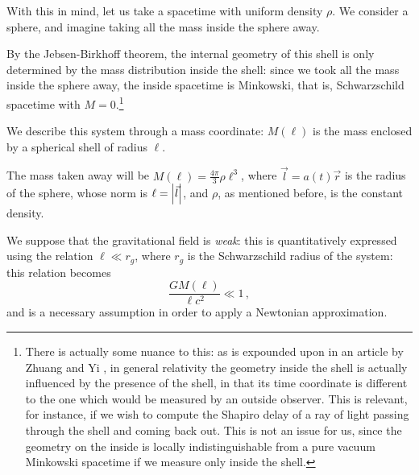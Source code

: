 \documentclass[main.tex]{subfiles}
\begin{document}
With this in mind, let us take a spacetime with uniform density \(\rho\).
We consider a sphere, and imagine taking all the mass inside the sphere away.


By the Jebsen-Birkhoff theorem, the internal geometry of this shell is only determined by the mass distribution inside the shell: since we took all the mass inside the sphere away, the inside spacetime is Minkowski, that is, Schwarzschild spacetime with \(M=0\).\footnote{There is actually some nuance to this: as is expounded upon in an article by Zhuang and Yi \cite{zhangCOMMONMISUNDERSTANDINGBIRKHOFF2012}, in general relativity the geometry inside the shell is actually influenced by the presence of the shell, in that its time coordinate is different to the one which would be measured by an outside observer. This is relevant, for instance, if we wish to compute the Shapiro delay of a ray of light passing through the shell and coming back out.
This is not an issue for us, since the geometry on the inside is locally indistinguishable from a pure vacuum Minkowski spacetime if we measure only inside the shell.}


We describe this system through a mass coordinate: \(M(\ell)\) is the mass enclosed by a spherical shell of radius \(\ell\).

The mass taken away will be \(M(\ell) = \frac{4 \pi}{3} \rho \ell^{3}\), where \(\vec{l} = a(t) \vec{r}\) is the radius of the sphere, whose norm is \(\ell = \abs{\vec{l}}\), and \(\rho \), as mentioned before, is the constant density.

We suppose that the gravitational field is \emph{weak}: this is quantitatively expressed using the relation \(\ell \ll r_g\), where \(r_g\) is the Schwarzschild radius of the system: this relation becomes
%
\begin{equation}
  \frac{GM(\ell)}{\ell c^2} \ll 1\,,
\end{equation}
%
and is a necessary assumption in order to apply a Newtonian approximation.
\end{document}
